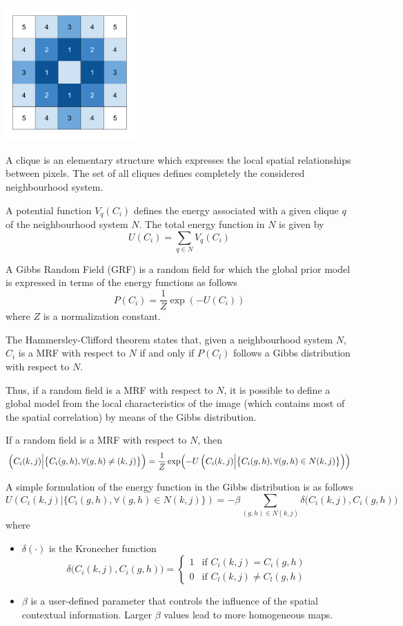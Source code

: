 \documentclass[oneside,onecolumn]{report}
\let\P\relax
\DeclareMathOperator*{\P}{P}
\begin{document}
\begin{center}
    \includegraphics[width=5cm]{neighbourhood_system.png}
\end{center}

A clique is an elementary structure which expresses the local spatial relationships between pixels. The set of all cliques defines completely the considered neighbourhood system.

A potential function $V_q(C_i)$ defines the energy associated with a given clique $q$ of the neighbourhood system $N$.
The total energy function in $N$ is given by
$$ U(C_i) = \sum_{q \in N} V_q(C_i) $$

A Gibbs Random Field (GRF) is a random field for which the global prior model is expressed in terms of the energy functions as follows
$$ P(C_i) = \frac{1}{Z} \exp(-U(C_i)) $$
where $Z$ is a normalization constant.

The Hammersley-Clifford theorem states that, given a neighbourhood system $N$, $C_i$ is a MRF with respect to $N$ if and only if $P(C_l)$ follows a Gibbs distribution with respect to $N$.

Thus, if a random field is a MRF with respect to $N$, it is possible to define a global model from the local characteristics of the image (which contains most of the spatial correlation) by means of the Gibbs distribution.

If a random field is a MRF with respect to $N$, then
$$ \P\Big(C_i(k, j) \Big| \big\{ C_i(g, h), \forall (g, h) \neq (k, j) \big\} \Big) = \frac{1}{Z} \exp(-U \left( C_i(k, j) \Big| \big\{ C_i(g, h), \forall (g, h) \in N(k, j) \big\} \right)) $$

A simple formulation of the energy function in the Gibbs distribution is as follows
$$ U \left( C_i(k, j) \Big| \big\{ C_i(g, h), \forall (g, h) \in N(k, j) \big\} \right) = -\beta \sum_{(g,h) \in N(k, j)} \delta \big(C_i(k, j), C_i(g, h) \big) $$
where
\begin{itemize}
    \item $\delta(\cdot)$ is the Kronecher function
    $$ \delta \big(C_i(k, j), C_i(g, h) \big) = \begin{cases}
        1 & \text{if } C_i(k, j) = C_i(g, h) \\
        0 & \text{if } C_l(k, j) \neq C_l(g, h)
    \end{cases} $$
    \item $\beta$ is a user-defined parameter that controls the influence of the spatial contextual information. Larger $\beta$ values lead to more homogeneous maps.
\end{itemize}
\end{document}
